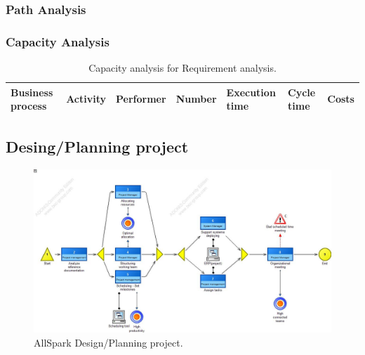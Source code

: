 \subsubsection{Path Analysis}

\begin{alltt}

\end{alltt}


\subsubsection{Capacity Analysis}


\begin{landscape}
\begin{table}
\centering
{\tiny
\begin{tabular}{|l|l|l|l|l|l|l|}
Business process&Activity&Performer&Number&Execution time&Cycle time&Costs\\
\hline

\end{tabular}
}
\caption{Capacity analysis for Requirement analysis.}
\end{table}
\end{landscape}
%

%

\subsection{Desing/Planning project}

\begin{figure}[ht!]
\begin{centering}
\includegraphics[scale=0.50, angle=90]{assign2/adonis/imgs/design.jpg}
\caption{AllSpark Design/Planning project.}
\label{2img:desing}
\end{centering}
\end{figure}


